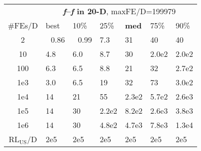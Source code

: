 \begin{tabular}{c|llllll}
 & \multicolumn{6}{|c}{\textbf{\textit{f}\raisebox{-0.35ex}{1}--\textit{f}\raisebox{-0.35ex}{24} in 20-D}, maxFE/D=199979}\\
\#FEs/D & best & 10\% & 25\% & \textbf{med} & 75\% & 90\%\\
2 & ~\,0.86 & ~\,0.99 & \hspace*{1ex}7.3 & 31 & 40 & 40\\
10 & \hspace*{1ex}4.8 & \hspace*{1ex}6.0 & \hspace*{1ex}8.7 & 30 & 2.0e2 & 2.0e2\\
100 & \hspace*{1ex}6.3 & \hspace*{1ex}6.5 & \hspace*{1ex}8.8 & 21 & 32 & 2.7e2\\
1e3 & \hspace*{1ex}3.0 & \hspace*{1ex}6.5 & 19 & 32 & 73 & 3.0e2\\
1e4 & 14 & 21 & 55 & 2.3e2 & 5.7e2 & 2.6e3\\
1e5 & 14 & 30 & 2.2e2 & 8.2e2 & 2.6e3 & 3.8e3\\
1e6 & 14 & 30 & 4.8e2 & 4.7e3 & 7.8e3 & 1.3e4\\
$\text{RL}_{\text{US}}$/D & 2e5 & 2e5 & 2e5 & 2e5 & 2e5 & 2e5
\end{tabular}
